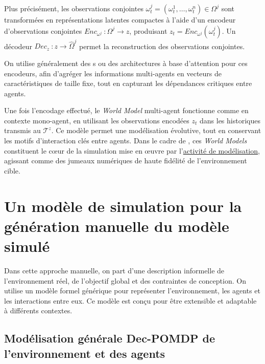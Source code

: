 Plus précisément, les observations conjointes $\omega_t^{j} = (\omega_t^1, \dots, \omega_t^n) \in \Omega^{j}$ sont transformées en représentations latentes compactes à l'aide d'un encodeur d'observations conjointes $Enc_{\omega^j}~: \Omega^j \rightarrow z$, produisant $z_t = Enc_{\omega^j}(\omega_t^j)$. Un décodeur $Dec_z~: z \rightarrow \hat{\Omega}^j$ permet la reconstruction des observations conjointes.

On utilise généralement des s ou des architectures à base d'attention pour ces encodeurs, afin d'agréger les informations multi-agents en vecteurs de caractéristiques de taille fixe, tout en capturant les dépendances critiques entre agents.

Une fois l'encodage effectué, le \textit{World Model} multi-agent fonctionne comme en contexte mono-agent, en utilisant les observations encodées $z_t$ dans les historiques transmis au  $\mathcal{T}^{z}$. Ce modèle permet une modélisation évolutive, tout en conservant les motifs d'interaction clés entre agents. Dans le cadre de , ces \textit{World Models} constituent le cœur de la simulation mise en œuvre par l'\hyperref[sec:modelling]{activité de modélisation}, agissant comme des jumeaux numériques de haute fidélité de l'environnement cible.

\section{Un modèle de simulation pour la génération manuelle du modèle simulé}

Dans cette approche manuelle, on part d'une description informelle de l'environnement réel, de l'objectif global et des contraintes de conception. On utilise un modèle formel générique pour représenter l'environnement, les agents et les interactions entre eux. Ce modèle est conçu pour être extensible et adaptable à différents contextes.

\subsection{Modélisation générale Dec-POMDP de l'environnement et des agents}


